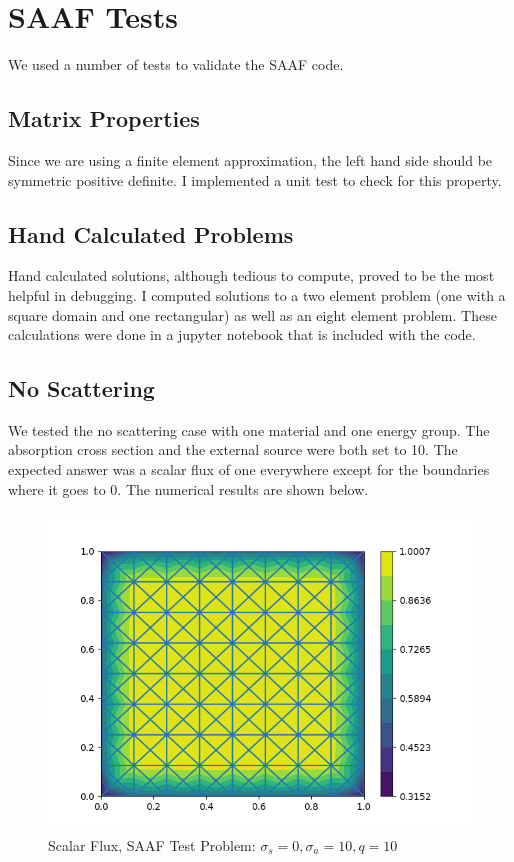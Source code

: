 \section{SAAF Tests}
We used a number of tests to validate the SAAF code. 
\subsection{Matrix Properties}
Since we are using a finite element approximation, the left hand side should be symmetric positive definite. I implemented a unit test to check for this property.

\subsection{Hand Calculated Problems}
Hand calculated solutions, although tedious to compute, proved to be the most helpful in debugging. I computed solutions to a two element problem (one with a square domain and one rectangular) as well as an eight element problem. These calculations were done in a jupyter notebook that is included with the code. 

\subsection{No Scattering}
We tested the no scattering case with one material and one energy group. The absorption cross section and the external source were both set to 10. The expected answer was a scalar flux of one everywhere except for the boundaries where it goes to 0. The numerical results are shown below.
\begin{figure}[H]
    \centering
    \includegraphics[width=\textwidth]{fig/noscatter_scalar_flux.png}
    \caption{Scalar Flux, SAAF Test Problem: $\sigma_s = 0, \sigma_a=10, q=10$}
    \label{fig:SAAF_noscatter}
\end{figure}

